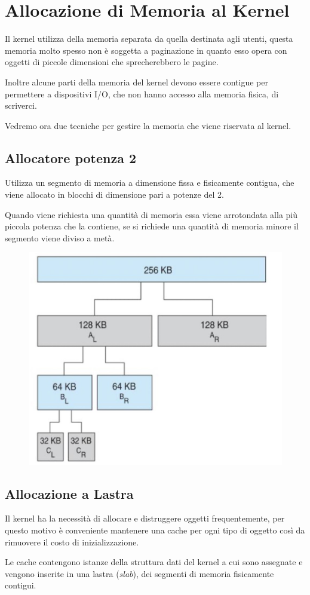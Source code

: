 \section{Allocazione di Memoria al Kernel}
Il kernel utilizza della memoria separata da quella destinata agli utenti, questa memoria molto spesso non è soggetta a paginazione in quanto esso opera con oggetti di piccole dimensioni che sprecherebbero le pagine.

Inoltre alcune parti della memoria del kernel devono essere contigue per permettere a dispositivi I/O, che non hanno accesso alla memoria fisica, di scriverci.

\spacer
Vedremo ora due tecniche per gestire la memoria che viene riservata al kernel.

\subsection{Allocatore potenza 2}
Utilizza un segmento di memoria a dimensione fissa e fisicamente contigua, che viene allocato in blocchi di dimensione pari a potenze del 2.

\spacer
Quando viene richiesta una quantità di memoria essa viene arrotondata alla più piccola potenza che la contiene, se si richiede una quantità di memoria minore il segmento viene diviso a metà.

\begin{figure}[H]
    \centering
    \includegraphics[width=0.4\linewidth]{assets/allocatore-potenza-2.jpg}
\end{figure}

\subsection{Allocazione a Lastra}
Il kernel ha la necessità di allocare e distruggere oggetti frequentemente, per questo motivo è conveniente mantenere una cache per ogni tipo di oggetto così da rimuovere il costo di inizializzazione.

\spacer
Le cache contengono istanze della struttura dati del kernel a cui sono assegnate e vengono inserite in una lastra (\textit{slab}), dei segmenti di memoria fisicamente contigui.

